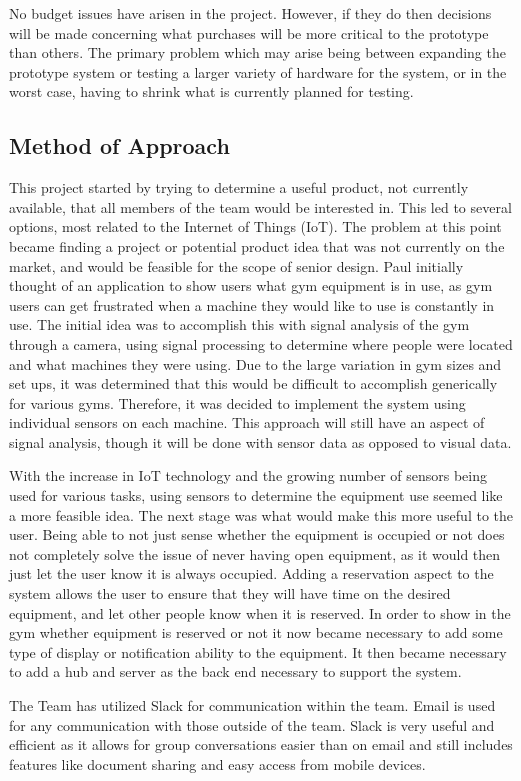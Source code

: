 \documentclass[PPFS.tex]{template/subfiles}
\begin{document}
    No budget issues have arisen in the project. However, if they do then decisions will be made concerning what purchases will be more critical to the prototype than others. The primary problem which may arise being between expanding the prototype system or testing a larger variety of hardware for the system, or in the worst case, having to shrink what is currently planned for testing.  
	
	\subsection{Method of Approach}
	This project started by trying to determine a useful product, not currently available, that all members of the team would be interested in. This led to several options, most related to the Internet of Things (IoT). The problem at this point became finding a project or potential product idea that was not currently on the market, and would be feasible for the scope of senior design. Paul initially thought of an application to show users what gym equipment is in use, as gym users can get frustrated when a machine they would like to use is constantly in use. The initial idea was to accomplish this with signal analysis of the gym through a camera, using signal processing to determine where people were located and what machines they were using. Due to the large variation in gym sizes and set ups, it was determined that this would be difficult to accomplish generically for various gyms. Therefore, it was decided to implement the system using individual sensors on each machine. This approach will still have an aspect of signal analysis, though it will be done with sensor data as opposed to visual data.  
	
	With the increase in IoT technology and the growing number of sensors being used for various tasks, using sensors to determine the equipment use seemed like a more feasible idea. The next stage was what would make this more useful to the user. Being able to not just sense whether the equipment is occupied or not does not completely solve the issue of never having open equipment, as it would then just let the user know it is always occupied. Adding a reservation aspect to the system allows the user to ensure that they will have time on the desired equipment, and let other people know when it is reserved. In order to show in the gym whether equipment is reserved or not it now became necessary to add some type of display or notification ability to the equipment. It then became necessary to add a hub and server as the back end necessary to support the system.
	
	The Team has utilized Slack for communication within the team. Email is used for any communication with those outside of the team. Slack is very useful and efficient as it allows for group conversations easier than on email and still includes features like document sharing and easy access from mobile devices. 
	
\end{document}
